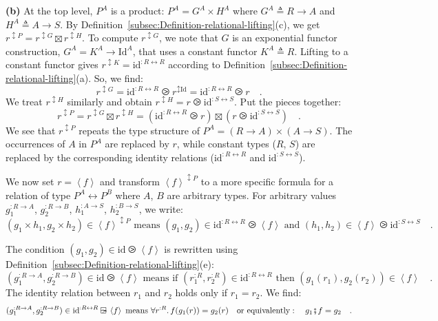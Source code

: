 \textbf{(b)} At the top level, $P^{A}$ is a product: $P^{A}=G^{A}\times H^{A}$
where $G^{A}\triangleq R\rightarrow A$ and $H^{A}\triangleq A\rightarrow S$.
By Definition~\ref{subsec:Definition-relational-lifting}(c), we
get $r^{\updownarrow P}=r^{\updownarrow G}\boxtimes r^{\updownarrow H}$.
To compute $r^{\updownarrow G}$, we note that $G$ is an exponential
functor construction, $G^{A}=K^{A}\rightarrow\text{Id}^{A}$, that
uses a constant functor $K^{A}\triangleq R$. Lifting to a constant
functor gives $r^{\updownarrow K}=\text{id}^{:R\leftrightarrow R}$
according to Definition~\ref{subsec:Definition-relational-lifting}(a).
So, we find:
\[
r^{\updownarrow G}=\text{id}^{:R\leftrightarrow R}\ogreaterthan r^{\updownarrow\text{Id}}=\text{id}^{:R\leftrightarrow R}\ogreaterthan r\quad.
\]
We treat $r^{\updownarrow H}$ similarly and obtain $r^{\updownarrow H}=r\ogreaterthan\text{id}^{:S\leftrightarrow S}$.
Put the pieces together:
\[
r^{\updownarrow P}=r^{\updownarrow G}\boxtimes r^{\updownarrow H}=(\text{id}^{:R\leftrightarrow R}\ogreaterthan r)\boxtimes(r\ogreaterthan\text{id}^{:S\leftrightarrow S})\quad.
\]
We see that $r^{\updownarrow P}$ repeats the type structure of $P^{A}=(R\rightarrow A)\times(A\rightarrow S)$.
The occurrences of $A$ in $P^{A}$ are replaced by $r$, while constant
types ($R$, $S$) are replaced by the corresponding identity relations
($\text{id}^{:R\leftrightarrow R}$ and $\text{id}^{:S\leftrightarrow S}$). 

We now set $r=\left<f\right>$ and transform $\left<f\right>^{\updownarrow P}$
to a more specific formula for a relation of type $P^{A}\leftrightarrow P^{B}$
where $A$, $B$ are arbitrary types. For arbitrary values $g_{1}^{:R\rightarrow A}$,
$g_{2}^{:R\rightarrow B}$, $h_{1}^{:A\rightarrow S}$, $h_{2}^{:B\rightarrow S}$,
we write:
\[
(g_{1}\times h_{1},g_{2}\times h_{2})\in\left<f\right>^{\updownarrow P}\text{ means }(g_{1},g_{2})\in\text{id}^{:R\leftrightarrow R}\ogreaterthan\left<f\right>\text{ and }(h_{1},h_{2})\in\left<f\right>\ogreaterthan\text{id}^{:S\leftrightarrow S}\quad.
\]

The condition $(g_{1},g_{2})\in\text{id}\ogreaterthan\left<f\right>$
is rewritten using Definition~\ref{subsec:Definition-relational-lifting}(e):
\[
(g_{1}^{:R\rightarrow A},g_{2}^{:R\rightarrow B})\in\text{id}\ogreaterthan\left<f\right>\text{ means if }(r_{1}^{:R},r_{2}^{:R})\in\text{id}^{:R\leftrightarrow R}\text{ then }(g_{1}(r_{1}),g_{2}(r_{2}))\in\left<f\right>\quad.
\]
The identity relation between $r_{1}$ and $r_{2}$ holds only if
$r_{1}=r_{2}$. We find:
\[
(g_{1}^{:R\rightarrow A},g_{2}^{:R\rightarrow B})\in\text{id}^{:R\leftrightarrow R}\ogreaterthan\left<f\right>\text{ means }\forall r^{:R}.\,f(g_{1}(r))=g_{2}(r)\quad\text{or equivalently}:\quad g_{1}\bef f=g_{2}\quad.
\]

